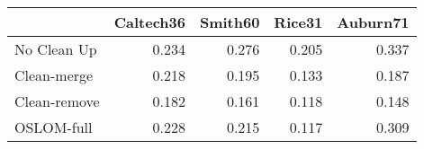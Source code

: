 \begin{tabular}{lrrrr}
\toprule
{} & Caltech36 & Smith60 & Rice31 & Auburn71 \\
\midrule
No Clean Up  &     0.234 &   0.276 &  0.205 &    0.337 \\
Clean-merge  &     0.218 &   0.195 &  0.133 &    0.187 \\
Clean-remove &     0.182 &   0.161 &  0.118 &    0.148 \\
OSLOM-full   &     0.228 &   0.215 &  0.117 &    0.309 \\
\bottomrule
\end{tabular}
